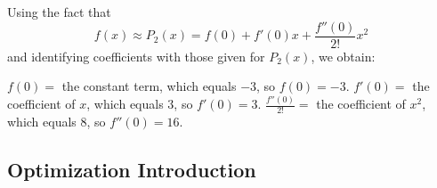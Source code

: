 \begin{enumerate}[1.]
\begin{multicols}{2}
\begin{Solution}
Using the fact that
\[f(x)\approx
P_2(x)=f(0)+f'(0)x+\frac{f''(0)}{2!}x^2\]
and identifying coefficients with those given for \(P_2(x)\), we obtain:
\par 
\(f(0)=\) the constant term, which equals \(-3\), so \(f(0)=-3\).
\(f'(0)=\) the coefficient of \(x\), which equals \(3\), so
\(f'(0)=3\).
\(\frac{f''(0)}{2!}=\) the coefficient of \(x^2\), which equals \(8\),
so \(f''(0)=16\).
\par\end{Solution}
\end{multicols} 

\hrulefill

\subsection*{Optimization Introduction}
\begin{multicols}{2}


\end{multicols}
\end{enumerate}
